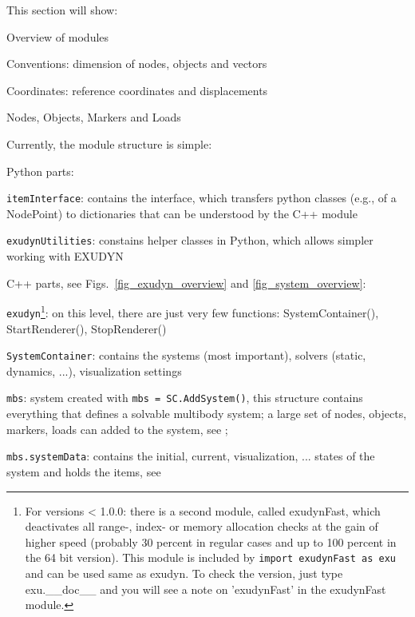 
 \label{sec:programStructure}
This section will show:
\bi
  \item Overview of modules
  \item Conventions: dimension of nodes, objects and vectors
	\item Coordinates: reference coordinates and displacements
	\item Nodes, Objects, Markers and Loads
\ei

Currently, the module structure is simple:
\bi
  \item Python parts:
	\bi
	  \item \texttt{itemInterface}: contains the interface, which transfers python classes (e.g., of a NodePoint) to dictionaries that can be understood by the C++ module
	  \item \texttt{exudynUtilities}: constains helper classes in Python, which allows simpler working with EXUDYN
	\ei
  \item C++ parts, see Figs.\ \ref{fig_exudyn_overview} and \ref{fig_system_overview}:
	\bi
	  \item \texttt{exudyn}\footnote{For versions < 1.0.0: there is a second module, called exudynFast, which deactivates all range-, index- or memory allocation checks at the gain of higher speed (probably 30 percent in regular cases and up to 100 percent in the 64 bit version). This module is included by \texttt{import exudynFast as exu} and can be used same as exudyn. To check the version, just type exu.\_\_doc\_\_ and you will see a note on 'exudynFast' in the exudynFast module.}: on this level, there are just very few functions: SystemContainer(), StartRenderer(), StopRenderer()
	  \item \texttt{SystemContainer}: contains the systems (most important), solvers (static, dynamics, ...), visualization settings
	  \item \texttt{mbs}: system created with \texttt{mbs = SC.AddSystem()}, this structure contains everything that defines a solvable multibody system; a large set of nodes, objects, markers, 
		loads can added to the system, see ;
		\item \texttt{mbs.systemData}: contains the initial, current, visualization, ... states of the system and holds the items, see 
	\ei
\ei
%
